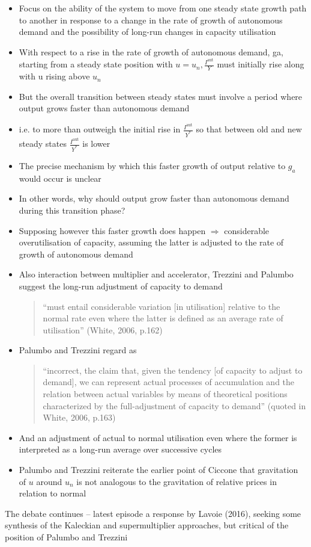 \documentclass{article}
\begin{document}
\begin{enumerate}
\begin{itemize}
			\item Focus on the ability of the system to move from one steady state growth path to another in response to a change in the rate of growth of autonomous demand and the possibility of long-run changes in capacity utilisation
			\item With respect to a rise in the rate of growth of autonomous demand, ga, starting from a steady state position with \( u = u_n, \frac{I^\text{aut}}{Y} \) must initially rise along with u rising above \( u_n \)
			\item But the overall transition between steady states must involve a period where output grows faster than autonomous demand
			\item i.e. to more than outweigh the initial rise in \( \frac{I^\text{aut}}{Y^*} \) so that between old and new steady states \( \frac{I^\text{aut}}{Y^*} \) is lower
			\item The precise mechanism by which this faster growth of output relative to \( g_a \) would occur is unclear
			\item In other words, why should output grow faster than autonomous demand during this transition phase?
			\item Supposing however this faster growth does happen \( \Rightarrow \) considerable overutilisation of capacity, assuming the latter is adjusted to the rate of growth of autonomous demand
			\item Also interaction between multiplier and accelerator, Trezzini and Palumbo suggest the long-run adjustment of capacity to demand
			\begin{quote}
				``must entail considerable variation [in utilisation] relative to the normal rate even where the latter is defined as an average rate of utilisation'' (White, 2006, p.162)
			\end{quote}
			\item Palumbo and Trezzini regard as
			\begin{quote}
				``incorrect, the claim that, given the tendency [of capacity to adjust to demand], we can represent actual processes of accumulation and the relation between actual variables by means of theoretical positions characterized by the full-adjustment of capacity to demand'' (quoted in White, 2006, p.163)
			\end{quote}
			\item And an adjustment of actual to normal utilisation even where the former is interpreted as a long-run average over successive cycles
			\item \textcolor{myred}{Palumbo and Trezzini reiterate the earlier point of Ciccone that gravitation of \( u \) around \( u_n \) is not analogous to the gravitation of relative prices in relation to normal}
		\end{itemize}
	\end{enumerate}
	The debate continues -- latest episode a response by Lavoie (2016), seeking some synthesis of the Kaleckian and supermultiplier approaches, but critical of the position of Palumbo and Trezzini
\end{document}
